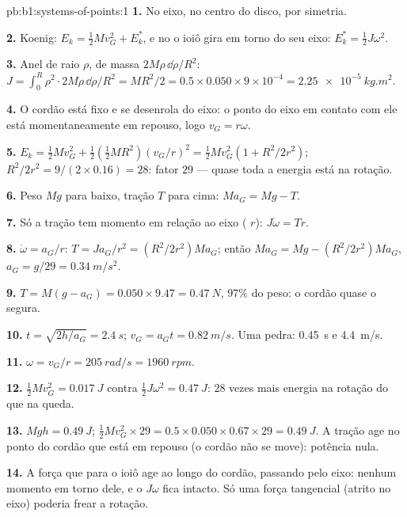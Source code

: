 \begin{solution}{pb:b1:systems-of-points:1}
\textbf{1.} No eixo, no centro do disco, por simetria.

\textbf{2.} Koenig: $E_k = \tfrac12 Mv_G^2 + E_k^*$, e no  o ioiô gira em torno do seu eixo: $E_k^* = \tfrac12 J\omega^2$.

\textbf{3.} Anel de raio $\rho$, de massa $2M\rho\,\dd\rho/R^2$: $J = \int_0^R
\rho^2\cdot 2M\rho\,\dd\rho/R^2 = MR^2/2 = 0.5 \times 0.050 \times 9\times10^{-4}
= \qty{2.25e-5}{kg.m^2}$.

\textbf{4.} O cordão está fixo e se desenrola do eixo: o ponto do eixo em
contato com ele está momentaneamente em repouso, logo $v_G = r\omega$.

\textbf{5.} $E_k = \tfrac12 Mv_G^2 + \tfrac12(\tfrac12 MR^2)(v_G/r)^2 = \tfrac12
Mv_G^2(1 + R^2/2r^2)$; $R^2/2r^2 = 9/(2 \times 0.16) = 28$: fator $29$ ---
quase toda a energia está na rotação.

\textbf{6.} Peso $Mg$ para baixo, tração $T$ para cima: $Ma_G = Mg - T$.

\textbf{7.} Só a tração tem momento em relação ao eixo ( $r$):
$J\dot\omega = Tr$.

\textbf{8.} $\dot\omega = a_G/r$: $T = Ja_G/r^2 = (R^2/2r^2)Ma_G$; então
$Ma_G = Mg - (R^2/2r^2)Ma_G$, $a_G = g/29 = \qty{0.34}{m/s^2}$.

\textbf{9.} $T = M(g - a_G) = 0.050 \times 9.47 = \qty{0.47}{N}$, $97\%$ do
peso: o cordão quase o segura.

\textbf{10.} $t = \sqrt{2h/a_G} = \qty{2.4}{s}$; $v_G = a_Gt = \qty{0.82}{m/s}$.
Uma pedra: \qty{0.45}{s} e \qty{4.4}{m/s}.

\textbf{11.} $\omega = v_G/r = \qty{205}{rad/s} = \qty{1960}{rpm}$.

\textbf{12.} $\tfrac12 Mv_G^2 = \qty{0.017}{J}$ contra $\tfrac12 J\omega^2 =
\qty{0.47}{J}$: $28$ vezes mais energia na rotação do que na queda.

\textbf{13.} $Mgh = \qty{0.49}{J}$; $\tfrac12 Mv_G^2 \times 29 = 0.5 \times 0.050
\times 0.67 \times 29 = \qty{0.49}{J}$. A tração age no ponto do cordão que
está em repouso (o cordão não se move): potência nula.

\textbf{14.} A força que para o ioiô age ao longo do cordão, passando pelo
eixo: nenhum momento em torno dele, e o  $J\omega$ fica intacto.
Só uma força tangencial (atrito no eixo) poderia frear a rotação.


\end{solution}
